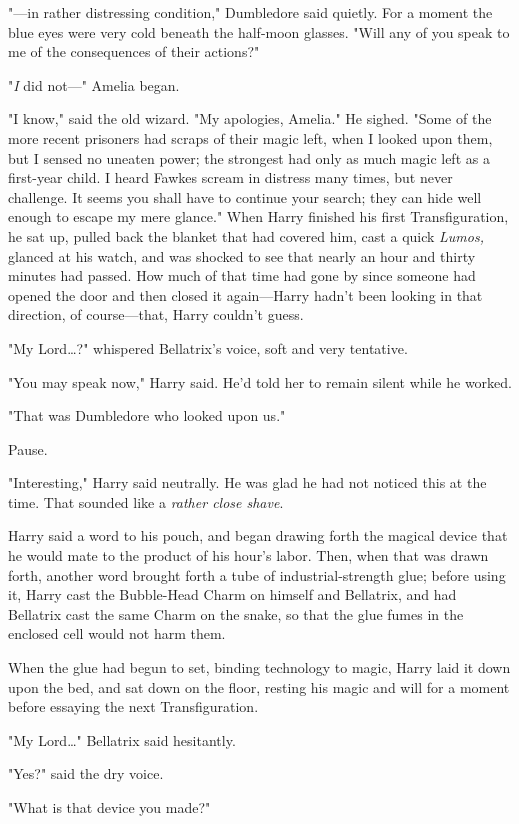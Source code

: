 "---in rather distressing condition," Dumbledore said quietly. For a moment the
blue eyes were very cold beneath the half-moon glasses. "Will any of you speak
to me of the consequences of their actions?"

"\emph{I} did not---" Amelia began.

"I know," said the old wizard. "My apologies, Amelia." He sighed. "Some of the
more recent prisoners had scraps of their magic left, when I looked upon them,
but I sensed no uneaten power; the strongest had only as much magic left as a
first-year child. I heard Fawkes scream in distress many times, but never
challenge. It seems you shall have to continue your search; they can hide well
enough to escape my mere glance."
\later
When Harry finished his first Transfiguration, he sat up, pulled back the
blanket that had covered him, cast a quick \emph{Lumos,} glanced at his watch,
and was shocked to see that nearly an hour and thirty minutes had passed. How
much of that time had gone by since someone had opened the door and then closed
it again---Harry hadn't been looking in that direction, of course---that, Harry
couldn't guess.

"My Lord…?" whispered Bellatrix's voice, soft and very tentative.

"You may speak now," Harry said. He'd told her to remain silent while he worked.

"That was Dumbledore who looked upon us."

Pause.

"Interesting," Harry said neutrally. He was glad he had not noticed this at the
time. That sounded like a \emph{rather close shave}.

Harry said a word to his pouch, and began drawing forth the magical device that
he would mate to the product of his hour's labor. Then, when that was drawn
forth, another word brought forth a tube of industrial-strength glue; before
using it, Harry cast the Bubble-Head Charm on himself and Bellatrix, and had
Bellatrix cast the same Charm on the snake, so that the glue fumes in the
enclosed cell would not harm them.

When the glue had begun to set, binding technology to magic, Harry laid it down
upon the bed, and sat down on the floor, resting his magic and will for a
moment before essaying the next Transfiguration.

"My Lord…" Bellatrix said hesitantly.

"Yes?" said the dry voice.

"What is that device you made?"

